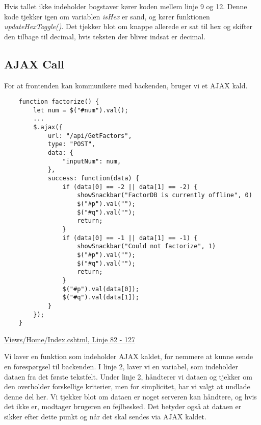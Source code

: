 \documentclass[a4paper,12pt]{extarticle}
\begin{document}
    \medskip

    Hvis tallet ikke indeholder bogstaver kører koden mellem linje 9 og 12.
    Denne kode tjekker igen om variablen \emph{isHex} er sand, og kører funktionen \emph{updateHexToggle()}.
    Det tjekker blot om knappe allerede er sat til hex og skifter den tilbage til decimal, hvis teksten der bliver indsat er decimal.

    \subsection{AJAX Call}
    For at frontenden kan kommunikere med backenden, bruger vi et AJAX kald.


    \begin{listing}[!ht]
        \begin{verbatim}
    function factorize() {
        let num = $("#num").val();
        ...
        $.ajax({
            url: "/api/GetFactors",
            type: "POST",
            data: {
                "inputNum": num,
            },
            success: function(data) {
                if (data[0] == -2 || data[1] == -2) { 
                    showSnackbar("FactorDB is currently offline", 0) 
                    $("#p").val("");
                    $("#q").val("");
                    return;
                }
                if (data[0] == -1 || data[1] == -1) { 
                    showSnackbar("Could not factorize", 1) 
                    $("#p").val("");
                    $("#q").val("");
                    return;
                }
                $("#p").val(data[0]);
                $("#q").val(data[1]);
            }
        });
    }
        \end{verbatim}
        \caption{\protect\href{https://github.com/Zymat-dk/RSACrackstation/blob/main/Views/Home/Index.cshtml}{Views/Home/Index.cshtml, Linje 82 - 127}}
    \end{listing}

    Vi laver en funktion som indeholder AJAX kaldet, for nemmere at kunne sende en forespørgsel til backenden.
    I linje 2, laver vi en variabel, som indeholder dataen fra det første tekstfelt.
    Under linje 2, håndterer vi dataen og tjekker om den overholder forskellige kriterier, men for simplicitet, har vi valgt at undlade denne del her.
    Vi tjekker blot om dataen er noget serveren kan håndtere, og hvis det ikke er, modtager brugeren en fejlbesked.
    Det betyder også at dataen er sikker efter dette punkt og når det skal sendes via AJAX kaldet.
\end{document}
